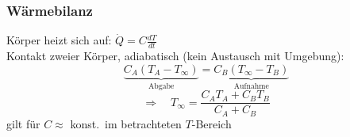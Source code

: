 \begin{sectionbox}
    \subsubsection{Wärmebilanz}
    Körper heizt sich auf: $\dot Q=C\frac{dT}{dt}$ \\
    Kontakt zweier Körper, adiabatisch (kein Austausch mit Umgebung):
    \begin{equation*}
        \underbrace{C_A(T_A-T_\infty)}_{\text{Abgabe}}=\underbrace{C_B(T_\infty-T_B)}_{\text{Aufnahme}}
    \end{equation*}
    \begin{equation*}
        \Rightarrow\quad T_\infty=\frac{C_AT_A+C_BT_B}{C_A+C_B}
    \end{equation*}
    gilt für $C\approx$ konst.\ im betrachteten $T$-Bereich
\end{sectionbox}